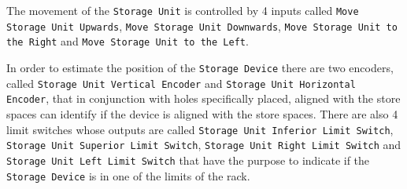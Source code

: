 The movement of the \verb|Storage Unit| is controlled by 4 inputs called \linebreak
\verb|Move Storage Unit Upwards|, \verb|Move Storage Unit Downwards|, \newline
\verb|Move Storage Unit to the Right| and
\verb|Move Storage Unit to the Left|.

In order to estimate the position of the \verb|Storage Device|  there are two
encoders, called \verb|Storage Unit Vertical Encoder| and
\verb|Storage Unit Horizontal Encoder|, that in conjunction with holes
specifically placed, aligned with the store spaces can identify if the device is
aligned with the store spaces. There are also 4 limit switches  whose outputs
are called
\verb|Storage Unit Inferior Limit Switch|,
\verb|Storage Unit Superior Limit Switch|,
\verb|Storage Unit Right Limit Switch| and
\verb|Storage Unit Left Limit Switch| that have the purpose to indicate if the
\verb|Storage Device| is in one of the limits of the rack.


